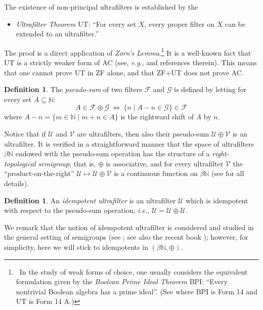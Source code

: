 \documentclass{amsart}
\theoremstyle{definition}
\newtheorem{definition}[theorem]{Definition}
\theoremstyle{remark}
\def\F{\mathscr{F}}
\def\G{\mathscr{G}}
\def\U{\mathscr{U}}
\def\V{\mathscr{V}}
\def\N{\mathbb{N}}
\begin{document}
The existence of non-principal ultrafilters is established
by the 

\smallskip
\begin{itemize}
\item
\emph{Ultrafilter Theorem} \textsf{UT}:
``For every set $X$, every proper filter on $X$ can be extended to an ultrafilter.''
\end{itemize}

\smallskip
The proof is a direct application of \emph{Zorn's Lemma}.\footnote
{~In the study of weak forms of choice, one usually
considers the equivalent formulation given by
the \emph{Boolean Prime Ideal Theorem} \textsf{BPI}:
``Every nontrivial Boolean algebra has a prime ideal''.
(See \cite{hr} where \textsf{BPI} is Form 14 
and \textsf{UT} is Form 14 A.)}
It is a well-known fact that \textsf{UT} is a strictly weaker 
form of \textsf{AC} (see, \emph{e.g.},
\cite{hr} and references therein). This means that 
one cannot prove \textsf{UT} in 
\textsf{ZF} alone, and that 
\textsf{ZF}+\textsf{UT} does not prove \textsf{AC}.


\begin{definition}
The \emph{pseudo-sum} 
of two filters $\F$ and $\G$
is defined by letting for every set $A\subseteq\N$:
$$A\in\F\oplus\G\ \Longleftrightarrow\ 
\{n\mid A-n\in\G\}\in\F$$
where $A-n=\{m\in\N\mid m+n\in A\}$ is
the rightward shift of $A$ by $n$.
\end{definition}


Notice that if $\U$ and $\V$ are ultrafilters,
then also their pseudo-sum $\U\oplus\V$ is an ultrafilter.
It is verified in a straightforward manner
that the space of ultrafilters $\beta\N$ endowed
with the pseudo-sum operation has the structure
of a \emph{right-topological semigroup}; that is, 
$\oplus$ is associative, and for every ultrafilter $\V$ 
the ``product-on-the-right'' $\U\mapsto\U\oplus\V$ 
is a continuous function on $\beta\N$ (see \cite{hs} for all details).

\begin{definition}
An \emph{idempotent ultrafilter}
is an ultrafilter $\U$ which is idempotent
with respect to the pseudo-sum operation, \emph{i.e.}, $\U=\U\oplus\U$.
\end{definition}

We remark that the notion of idempotent ultrafilter is
considered and studied in the general setting of semigroups
(see \cite{hs}; see also the recent book
\cite{t}); however, for simplicity,
here we will stick to idempotents in $(\beta\N,\oplus)$. 
\end{document}

